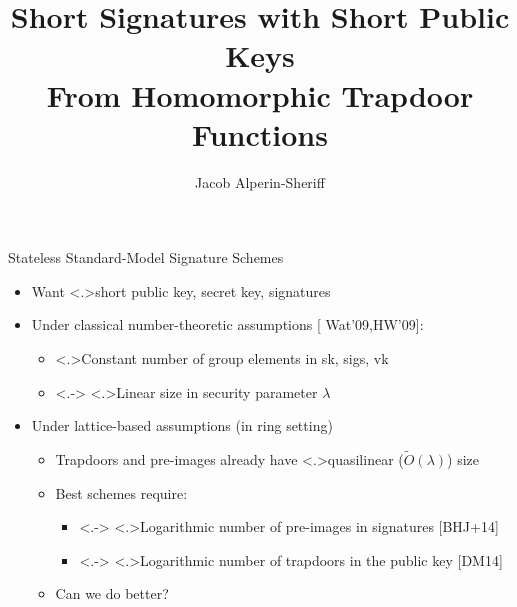 \documentclass[shadow,xcolor=pdftex,svgnames,table,t]{beamer}
\title
{ Short Signatures with Short Public Keys\\From Homomorphic Trapdoor Functions
}
\author
{ {\Large Jacob Alperin-Sheriff}
}
\institute{School of Computer Science\\Georgia Tech}
\date
{

}
\begin{document}
\setlength{\abovedisplayskip}{8pt plus 2pt minus 1pt}
\setlength{\belowdisplayskip}{8pt plus 2pt minus 0pt}
\setlength{\abovedisplayshortskip}{0pt plus 2pt}
\setlength{\belowdisplayshortskip}{8pt plus 2pt minus 1pt}

\begin{frame}[label=title]
  \titlepage
\end{frame}

\begin{frame}[label=stateless]{Stateless Standard-Model Signature Schemes}
\medskip
{}
\medskip
\begin{itemize}

\item<+-> Want \alert<.>{short} public key, secret key, signatures
\smallskip
\item<+-> Under classical number-theoretic assumptions [\citationsize
  Wat'09,HW'09]:
\begin{itemize}
\smallskip
\item<+-> \alert<.>{Constant} number of group elements in sk, sigs, vk
\smallskip
\item<.-> \alert<.>{Linear} size in security parameter $\lambda$
\end{itemize}
\smallskip
\item<+-> Under lattice-based assumptions (in ring setting)
\begin{itemize}
\item<+-> Trapdoors and pre-images already have \alert<.>{quasilinear} ($\tilde{O}(\lambda)$) size
\smallskip
\item<+-> Best schemes require:
\smallskip
\begin{itemize}
\item<.-> \alert<.>{Logarithmic} number of pre-images in signatures [\citationsize BHJ+14]
\smallskip
\item<.-> \alert<.>{Logarithmic} number of trapdoors in the public key [\citationsize DM14]
\end{itemize}
\smallskip
\item<+-> Can we do better?
\end{itemize}
\end{itemize}
\end{frame}
\end{document}

